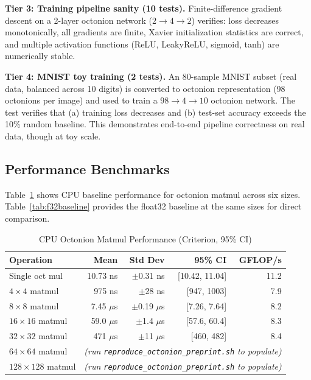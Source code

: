 \documentclass[11pt,a4paper]{article}
\begin{document}
\textbf{Tier 3: Training pipeline sanity (10 tests).} Finite-difference gradient descent on a 2-layer octonion network ($2 \to 4 \to 2$) verifies: loss decreases monotonically, all gradients are finite, Xavier initialization statistics are correct, and multiple activation functions (ReLU, LeakyReLU, sigmoid, tanh) are numerically stable.

\textbf{Tier 4: MNIST toy training (2 tests).} An 80-sample MNIST subset (real data, balanced across 10 digits) is converted to octonion representation (98 octonions per image) and used to train a $98 \to 4 \to 10$ octonion network. The test verifies that (a) training loss decreases and (b) test-set accuracy exceeds the 10\% random baseline. This demonstrates end-to-end pipeline correctness on real data, though at toy scale.

\subsection{Performance Benchmarks}

Table~\ref{tab:benchmarks} shows CPU baseline performance for octonion matmul across six sizes. Table~\ref{tab:f32baseline} provides the float32 baseline at the same sizes for direct comparison.

\begin{table}[h]
\centering
\caption{CPU Octonion Matmul Performance (Criterion, 95\% CI)}
\label{tab:benchmarks}
\begin{tabular}{@{}lrrrr@{}}
\toprule
Operation & Mean & Std Dev & 95\% CI & GFLOP/s \\
\midrule
Single oct mul & 10.73 ns & $\pm$0.31 ns & [10.42, 11.04] & 11.2 \\
$4\times4$ matmul & 975 ns & $\pm$28 ns & [947, 1003] & 7.9 \\
$8\times8$ matmul & 7.45 $\mu$s & $\pm$0.19 $\mu$s & [7.26, 7.64] & 8.2 \\
$16\times16$ matmul & 59.0 $\mu$s & $\pm$1.4 $\mu$s & [57.6, 60.4] & 8.3 \\
$32\times32$ matmul & 471 $\mu$s & $\pm$11 $\mu$s & [460, 482] & 8.4 \\
$64\times64$ matmul & \multicolumn{4}{c}{\textit{(run \texttt{reproduce\_octonion\_preprint.sh} to populate)}} \\
$128\times128$ matmul & \multicolumn{4}{c}{\textit{(run \texttt{reproduce\_octonion\_preprint.sh} to populate)}} \\
\bottomrule
\end{tabular}
\end{table}
\end{document}
